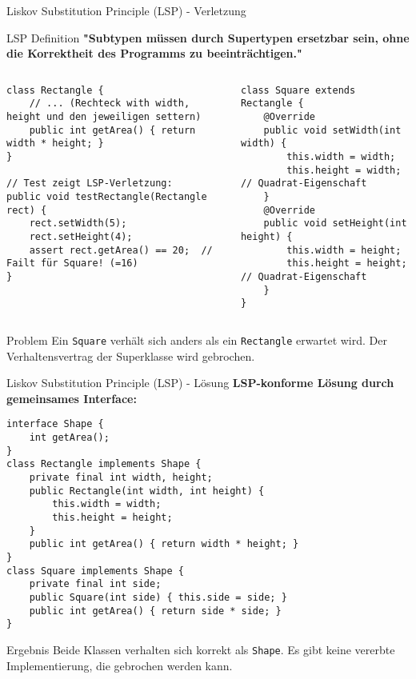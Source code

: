 \begin{frame}[fragile]{Liskov Substitution Principle (LSP) - Verletzung}
  \begin{exampleblock}{LSP Definition}
    \textbf{"Subtypen müssen durch Supertypen ersetzbar sein, ohne die Korrektheit des Programms zu beeinträchtigen."}
  \end{exampleblock}

  \vspace{-0.2cm}
  \begin{columns}[T]

    \begin{lstlisting}[style=java, basicstyle=\tiny\ttfamily]
class Rectangle {
    // ... (Rechteck with width, height und den jeweiligen settern)
    public int getArea() { return width * height; }
}

// Test zeigt LSP-Verletzung:
public void testRectangle(Rectangle rect) {
    rect.setWidth(5);
    rect.setHeight(4);
    assert rect.getArea() == 20;  // Failt für Square! (=16)
}
    \end{lstlisting}

    \begin{lstlisting}[style=java, basicstyle=\tiny\ttfamily]
class Square extends Rectangle {
    @Override
    public void setWidth(int width) {
        this.width = width;
        this.height = width;  // Quadrat-Eigenschaft
    }
    @Override
    public void setHeight(int height) {
        this.width = height;
        this.height = height; // Quadrat-Eigenschaft
    }
}
    \end{lstlisting}
  \end{columns}
  \vspace{-0.2cm}

  \begin{alertblock}{Problem}
    Ein \texttt{Square} verhält sich anders als ein \texttt{Rectangle} erwartet wird. Der Verhaltensvertrag der Superklasse wird gebrochen.
  \end{alertblock}
\end{frame}

\begin{frame}[fragile]{Liskov Substitution Principle (LSP) - Lösung}
  \textbf{LSP-konforme Lösung durch gemeinsames Interface:}
  \begin{lstlisting}[style=java, basicstyle=\tiny\ttfamily]
interface Shape {
    int getArea();
}
class Rectangle implements Shape {
    private final int width, height;
    public Rectangle(int width, int height) {
        this.width = width;
        this.height = height;
    }
    public int getArea() { return width * height; }
}
class Square implements Shape {
    private final int side;
    public Square(int side) { this.side = side; }
    public int getArea() { return side * side; }
}
  \end{lstlisting}
  \begin{exampleblock}{Ergebnis}
    Beide Klassen verhalten sich korrekt als \texttt{Shape}. Es gibt keine vererbte Implementierung, die gebrochen werden kann.
  \end{exampleblock}
\end{frame}

